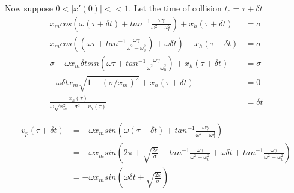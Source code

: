 \documentclass{book}
\renewcommand{\(}{\begin{columns}}
\renewcommand{\)}{\end{columns}}
\newcommand{\<}[1]{\begin{column}{#1}}
\renewcommand{\>}{\end{column}}
\begin{document}
 
Now suppose $0<|x'(0)|<<1$.   
Let the time of collision $t_c=\tau+\delta t$
\begin{align*}
x_mcos\left(\omega (\tau+\delta t)+tan^{-1}\frac{\omega 
\gamma}{\omega^2-\omega_0^2}\right)+x_h(\tau+\delta t)&=\sigma\\
x_mcos\left(\left(\omega \tau+tan^{-1}\frac{\omega 
\gamma}{\omega^2-\omega_0^2}\right)+\omega \delta t\right)+x_h(\tau+\delta t)&=\sigma\\
\sigma-\omega x_m\delta t sin\left(\omega \tau+tan^{-1}\frac{\omega 
\gamma}{\omega^2-\omega_0^2}\right)+x_h(\tau+\delta t)&=\sigma\\
-\omega \delta tx_m\sqrt{1-(\sigma/x_m)^2}+x_h(\tau+\delta t)&=0\\
\frac{x_h(\tau)}{\omega\sqrt{x_m^2-\sigma^2}-v_h(\tau)}&=\delta t
\end{align*}
 

 
\begin{align*}
v_p(\tau+\delta t)&=-\omega x_m sin\left( \omega (\tau+\delta t)+tan^{-1}\frac{\omega 
\gamma}{\omega^2-\omega_0^2}\right)\\
&=-\omega x_m sin\left( 
2\pi+\sqrt{\frac{2\varepsilon}{\sigma}}-tan^{-1}\frac{\omega 
\gamma}{\omega^2-\omega_0^2}+\omega \delta t + tan^{-1}\frac{\omega 
\gamma}{\omega^2-\omega_0^2} \right)\\
&=-\omega x_m sin\left(\omega\delta t+\sqrt{\frac{2\varepsilon}{\sigma}}\right) 
\end{align*}




{}

\end{document}
